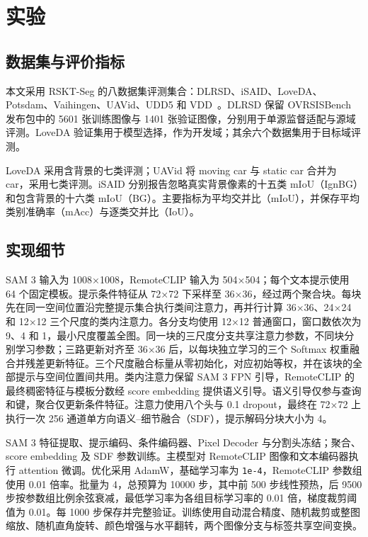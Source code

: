 
\section{实验}
\subsection{数据集与评价指标}
本文采用 RSKT-Seg 的八数据集评测集合：DLRSD、iSAID、LoveDA、Potsdam、Vaihingen、UAVid、UDD5 和 VDD~\cite{liExploringEfficientOpenVocabulary2026}。DLRSD 保留 OVRSISBench 发布包中的 5601 张训练图像与 1401 张验证图像，分别用于单源监督适配与源域评测。LoveDA 验证集用于模型选择，作为开发域；其余六个数据集用于目标域评测。

LoveDA 采用含背景的七类评测；UAVid 将 moving car 与 static car 合并为 car，采用七类评测。iSAID 分别报告忽略真实背景像素的十五类 mIoU（IgnBG）和包含背景的十六类 mIoU（BG）。主要指标为平均交并比（mIoU），并保存平均类别准确率（mAcc）与逐类交并比（IoU）。

\subsection{实现细节}
SAM 3 输入为 1008×1008，RemoteCLIP 输入为 504×504；每个文本提示使用 64 个固定模板。提示条件特征从 72×72 下采样至 36×36，经过两个聚合块。每块先在同一空间位置沿完整提示集合执行类间注意力，再并行计算 36×36、24×24 和 12×12 三个尺度的类内注意力。各分支均使用 12×12 普通窗口，窗口数依次为 9、4 和 1，最小尺度覆盖全图。同一块的三尺度分支共享注意力参数，不同块分别学习参数；三路更新对齐至 36×36 后，以每块独立学习的三个 Softmax 权重融合并残差更新特征。三个尺度融合标量从零初始化，对应初始等权，并在该块的全部提示与空间位置间共用。类内注意力保留 SAM 3 FPN 引导，RemoteCLIP 的最终稠密特征与模板分数经 score embedding 提供语义引导。语义引导仅参与查询和键，聚合仅更新条件特征。注意力使用八个头与 0.1 dropout，最终在 72×72 上执行一次 256 通道单方向语义--细节融合（SDF），提示解码分块大小为 4。

SAM 3 特征提取、提示编码、条件编码器、Pixel Decoder 与分割头冻结；聚合、score embedding 及 SDF 参数训练。主模型对 RemoteCLIP 图像和文本编码器执行 attention 微调。优化采用 AdamW，基础学习率为 \texttt{1e-4}，RemoteCLIP 参数组使用 0.01 倍率。批量为 4，总预算为 10000 步，其中前 500 步线性预热，后 9500 步按参数组比例余弦衰减，最低学习率为各组目标学习率的 0.01 倍，梯度裁剪阈值为 0.01。每 1000 步保存并完整验证。训练使用自动混合精度、随机裁剪或整图缩放、随机直角旋转、颜色增强与水平翻转，两个图像分支与标签共享空间变换。

